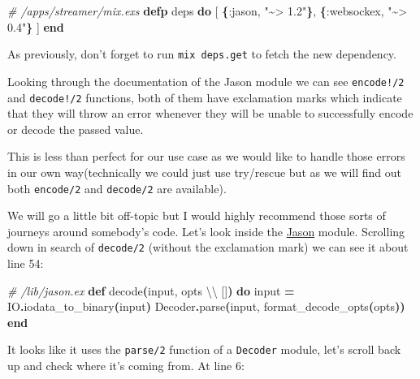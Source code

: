 \documentclass[
  oneside]{book}
\newenvironment{Shaded}{\begin{snugshade}}{\end{snugshade}}
\newcommand{\CommentTok}[1]{\textcolor[rgb]{0.56,0.35,0.01}{\textit{#1}}}
\newcommand{\ConstantTok}[1]{\textcolor[rgb]{0.56,0.35,0.01}{#1}}
\newcommand{\FunctionTok}[1]{\textcolor[rgb]{0.13,0.29,0.53}{\textbf{#1}}}
\newcommand{\KeywordTok}[1]{\textcolor[rgb]{0.13,0.29,0.53}{\textbf{#1}}}
\newcommand{\NormalTok}[1]{#1}
\newcommand{\OperatorTok}[1]{\textcolor[rgb]{0.81,0.36,0.00}{\textbf{#1}}}
\newcommand{\OtherTok}[1]{\textcolor[rgb]{0.56,0.35,0.01}{#1}}
\newcommand{\StringTok}[1]{\textcolor[rgb]{0.31,0.60,0.02}{#1}}
\newcommand{\VariableTok}[1]{\textcolor[rgb]{0.00,0.00,0.00}{#1}}
\begin{document}
\begin{Shaded}
\begin{Highlighting}[]
  \CommentTok{\# /apps/streamer/mix.exs}
  \KeywordTok{defp}\NormalTok{ deps }\KeywordTok{do}
    \OtherTok{[}
      \FunctionTok{\{}\VariableTok{:jason}\NormalTok{, }\StringTok{"\textasciitilde{}\textgreater{} 1.2"}\FunctionTok{\}}\NormalTok{,}
      \FunctionTok{\{}\VariableTok{:websockex}\NormalTok{, }\StringTok{"\textasciitilde{}\textgreater{} 0.4"}\FunctionTok{\}}
    \OtherTok{]}
  \KeywordTok{end}
\end{Highlighting}
\end{Shaded}

As previously, don't forget to run \texttt{mix\ deps.get} to fetch the new dependency.

Looking through the documentation of the Jason module we can see \texttt{encode!/2} and \texttt{decode!/2} functions, both of them have exclamation marks which indicate that they will throw an error whenever they will be unable to successfully encode or decode the passed value.

This is less than perfect for our use case as we would like to handle those errors in our own way(technically we could just use try/rescue but as we will find out both \texttt{encode/2} and \texttt{decode/2} are available).

We will go a little bit off-topic but I would highly recommend those sorts of journeys around somebody's code. Let's look inside the \href{https://github.com/michalmuskala/jason/blob/master/lib/jason.ex}{Jason} module. Scrolling down in search of \texttt{decode/2} (without the exclamation mark) we can see it about line 54:

\begin{Shaded}
\begin{Highlighting}[]
  \CommentTok{\# /lib/jason.ex}
  \KeywordTok{def}\NormalTok{ decode}\FunctionTok{(}\NormalTok{input, opts \textbackslash{}\textbackslash{} }\OtherTok{[]}\FunctionTok{)} \KeywordTok{do}
\NormalTok{    input }\OperatorTok{=} \ConstantTok{IO}\OperatorTok{.}\NormalTok{iodata\_to\_binary}\FunctionTok{(}\NormalTok{input}\FunctionTok{)}
    \ConstantTok{Decoder}\OperatorTok{.}\NormalTok{parse}\FunctionTok{(}\NormalTok{input, format\_decode\_opts}\FunctionTok{(}\NormalTok{opts}\FunctionTok{))}
  \KeywordTok{end}
\end{Highlighting}
\end{Shaded}

\newpage

It looks like it uses the \texttt{parse/2} function of a \texttt{Decoder} module, let's scroll back up and check where it's coming from. At line 6:
\end{document}
